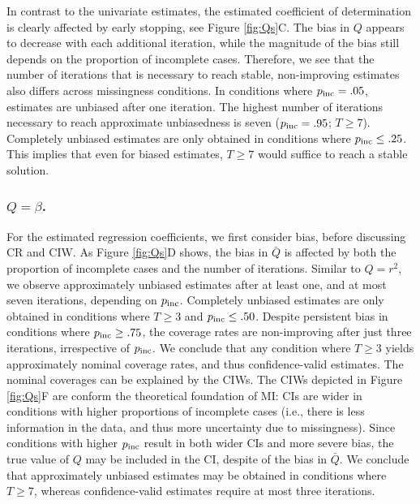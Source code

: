 \documentclass[Royal,times,sageh]{sagej}
\begin{document}
In contrast to the univariate estimates, the estimated coefficient of determination is clearly affected by early stopping, see Figure \ref{fig:Qs}C. The bias in \(Q\) appears to decrease with each additional iteration, while the magnitude of the bias still depends on the proportion of incomplete cases. Therefore, we see that the number of iterations that is necessary to reach stable, non-improving estimates also differs across missingness conditions. In conditions where \(p_{\rm inc}=.05\), estimates are unbiased after one iteration. The highest number of iterations necessary to reach approximate unbiasedness is seven (\(p_{\rm inc}=.95\); \(T\geq7\)). Completely unbiased estimates are only obtained in conditions where \(p_{\rm inc}\leq.25\). This implies that even for biased estimates, \(T\geq7\) would suffice to reach a stable solution.

\hypertarget{qbeta.}{%
\subsubsection{\texorpdfstring{\(Q=\beta\).}{Q=\textbackslash beta.}}\label{qbeta.}}

For the estimated regression coefficients, we first consider bias, before discussing CR and CIW. As Figure \ref{fig:Qs}D shows, the bias in \(\bar{Q}\) is affected by both the proportion of incomplete cases and the number of iterations. Similar to \(Q=r^2\), we observe approximately unbiased estimates after at least one, and at most seven iterations, depending on \(p_{\rm inc}\). Completely unbiased estimates are only obtained in conditions where \(T\geq3\) and \(p_{\rm inc}\leq .50\). Despite persistent bias in conditions where \(p_{\rm inc}\geq.75\), the coverage rates are non-improving after just three iterations, irrespective of \(p_{\rm inc}\). We conclude that any condition where \(T\geq3\) yields approximately nominal coverage rates, and thus confidence-valid estimates.
The nominal coverages can be explained by the CIWs. The CIWs depicted in Figure \ref{fig:Qs}F are conform the theoretical foundation of MI: CIs are wider in conditions with higher proportions of incomplete cases (i.e., there is less information in the data, and thus more uncertainty due to missingness). Since conditions with higher \(p_{\rm inc}\) result in both wider CIs and more severe bias, the true value of \(Q\) may be included in the CI, despite of the bias in \(\bar{Q}\).
We conclude that approximately unbiased estimates may be obtained in conditions where \(T\geq7\), whereas confidence-valid estimates require at most three iterations.
\end{document}
